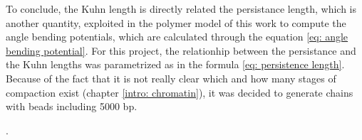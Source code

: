 To conclude, the Kuhn length is directly related the persistance length, which is another quantity, exploited in the polymer model of this work to compute the angle bending potentials, which are calculated through the equation \ref{eq: angle bending potential}. For this project, the relationhip between the persistance and the Kuhn lengths was parametrized as in the formula \ref{eq: persistence length}.\\

Because of the fact that it is not really clear which and how many stages of compaction exist (chapter \ref{intro: chromatin}), it was decided to generate chains with beads including 5000 bp.





.

